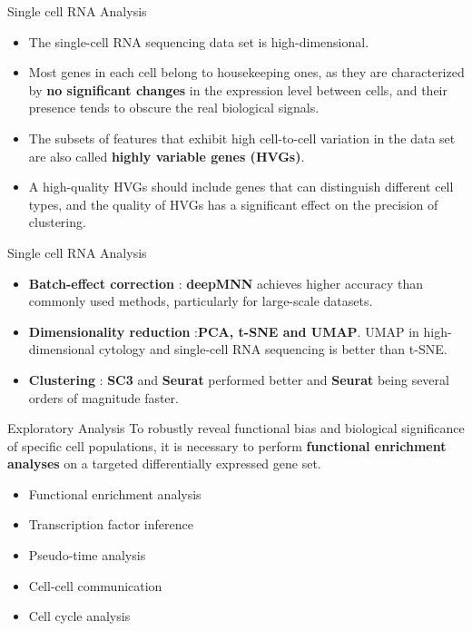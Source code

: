 \documentclass[12pt, aspectratio=43]{beamer}
\begin{document}
\begin{frame}{Single cell RNA Analysis}
	\begin{itemize}
		\item The single-cell RNA sequencing data set is high-dimensional.
		\item Most genes in each cell belong to housekeeping ones, as they are characterized by \textbf{no significant changes} in the expression level between cells, and their presence tends to obscure the real biological signals.
		\item  The subsets of features that exhibit high cell-to-cell variation in the data set are also called \textbf{highly variable genes (HVGs)}.
		\item A high-quality HVGs should include genes that can distinguish different cell types, and the quality of HVGs has a significant effect on the precision of clustering.
	\end{itemize}
\end{frame}

\begin{frame}{Single cell RNA Analysis}
	\begin{itemize}
		\item \textbf{Batch-effect correction} : \textbf{deepMNN} achieves higher accuracy than commonly used methods, particularly for large-scale datasets.
		\item \textbf{Dimensionality reduction} :\textbf{PCA, t-SNE and UMAP}. UMAP in high-dimensional cytology and single-cell RNA sequencing is better than t-SNE.
		\item \textbf{Clustering} : \textbf{SC3} and \textbf{Seurat} performed better and \textbf{Seurat} being several orders of magnitude faster.
	\end{itemize}
	
\end{frame}


\begin{frame}{Exploratory Analysis}
	To robustly reveal functional bias and biological significance of specific cell populations, it is necessary to perform \textbf{functional enrichment analyses} on a targeted differentially expressed gene set.
	\begin{itemize}
		\item Functional enrichment analysis
		\item Transcription factor inference
		\item Pseudo-time analysis
		\item Cell-cell communication
		\item Cell cycle analysis
	\end{itemize}
	
\end{frame}
\end{document}
